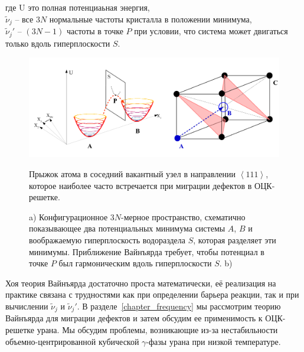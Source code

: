 \documentclass[master,14pt,subf,href,colorlinks=true
]{disser}
\begin{document}
\noindent где U это полная потенциаьная энергия,\\$\tilde{\nu}_j$ -- все $3N$ нормальные частоты кристалла в положении минимума, \\$\tilde{\nu}_j'$ -- $(3N-1)$ частоты в точке $P$ при условии, что система может двигаться только вдоль гиперплоскости  $S$.

\begin{figure}[h]	%
	\begin{center}
		\includegraphics[width=1\linewidth]{Parabolas.pdf} %
\caption{\label{graph_parabolas}a) Конфигурационное $3N$-мерное пространство, схематично показывающее два потенциальных минимума системы $A$, $B$ и воображаемую гиперплоскость водораздела $S$, которая разделяет эти минимумы. Приближение Вайнъярда требует, чтобы потенциал в точке $P$ был гармоническим вдоль гиперплоскости $S$.
b)} Прыжок атома в соседний вакантный узел в направлении $\left\langle111\right\rangle$, которое наиболее часто встречается при миграции дефектов в ОЦК-решетке.
	\end{center}
\end{figure}

Хоя теория Вайнъярда достаточно проста математически, её реализация на практике связана с трудностями как при определении барьера реакции, так и при вычислении $\tilde{\nu}_j$ и $\tilde{\nu}_j'$.
В разделе~\ref{chapter_frequency} мы рассмотрим теорию Вайнъярда для миграции дефектов и затем обсудим ее применимость к ОЦК-решетке урана. Мы обсудим проблемы, возникающие из-за нестабильности объемно-центрированной кубической $\gamma$-фазы урана при низкой температуре.
\end{document}
